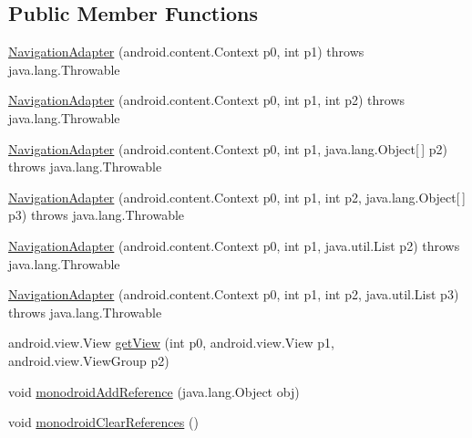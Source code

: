 \subsection*{Public Member Functions}
\begin{DoxyCompactItemize}
\item 
\hyperlink{classfieldservice_1_1android_1_1_navigation_adapter_a9783bd37015cb48dda132a1d1a982ffd}{Navigation\+Adapter} (android.\+content.\+Context p0, int p1)  throws java.\+lang.\+Throwable 	
\item 
\hyperlink{classfieldservice_1_1android_1_1_navigation_adapter_a9978e8d3c75f98babec8b58a8eaf60de}{Navigation\+Adapter} (android.\+content.\+Context p0, int p1, int p2)  throws java.\+lang.\+Throwable 	
\item 
\hyperlink{classfieldservice_1_1android_1_1_navigation_adapter_ae8ad64b04daab96ae76728c9d6c2b8e9}{Navigation\+Adapter} (android.\+content.\+Context p0, int p1, java.\+lang.\+Object\mbox{[}$\,$\mbox{]} p2)  throws java.\+lang.\+Throwable 	
\item 
\hyperlink{classfieldservice_1_1android_1_1_navigation_adapter_aedaa475e30e99d16d431dbad6dabb2ca}{Navigation\+Adapter} (android.\+content.\+Context p0, int p1, int p2, java.\+lang.\+Object\mbox{[}$\,$\mbox{]} p3)  throws java.\+lang.\+Throwable 	
\item 
\hyperlink{classfieldservice_1_1android_1_1_navigation_adapter_a69c911bb3b28391d5b2a0c6c9bfebaa1}{Navigation\+Adapter} (android.\+content.\+Context p0, int p1, java.\+util.\+List p2)  throws java.\+lang.\+Throwable 	
\item 
\hyperlink{classfieldservice_1_1android_1_1_navigation_adapter_a11ee44b5d5cbf5e618a14ab25cd320a5}{Navigation\+Adapter} (android.\+content.\+Context p0, int p1, int p2, java.\+util.\+List p3)  throws java.\+lang.\+Throwable 	
\item 
android.\+view.\+View \hyperlink{classfieldservice_1_1android_1_1_navigation_adapter_a17aa234f5ff9f1124c3844f92337afec}{get\+View} (int p0, android.\+view.\+View p1, android.\+view.\+View\+Group p2)
\item 
void \hyperlink{classfieldservice_1_1android_1_1_navigation_adapter_ab6286240eee67621162326c5a380fb8c}{monodroid\+Add\+Reference} (java.\+lang.\+Object obj)
\item 
void \hyperlink{classfieldservice_1_1android_1_1_navigation_adapter_a994fd1be6d9c9b47618c933ab2c0e7cb}{monodroid\+Clear\+References} ()
\end{DoxyCompactItemize}


